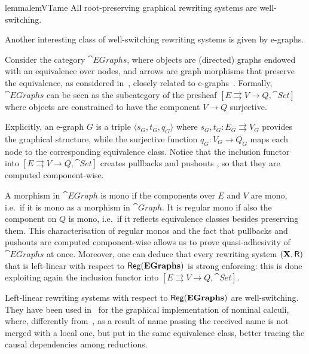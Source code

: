 \begin{lemma}{lemma}{lemVTame}
	\label{bono}
	All root-preserving graphical rewriting systems are well-switching.
\end{lemma}

Another interesting class of well-switching rewriting systems is given by e-graphs.

\begin{example}[E-graphs]
	Consider the category $\cat{EGraphs}$, where objects are (directed)
	graphs endowed with an equivalence over nodes, and arrows are graph
	morphisms that preserve the equivalence, as considered
	in~\cite{BaldanGM06}, closely related to e-graphs~\cite{WNW:egg}. 
	Formally, $\cat{EGraphs}$ can be seen as the
	subcategory of the presheaf
	$[E \rightrightarrows V \to Q, \cat{Set}]$ where objects are
	constrained to have the component $V \to Q$ surjective. 
	
	Explicitly, an
	e-graph $G$ is a triple $\langle s_G, t_G, q_G \rangle$ where
	$s_G, t_G: E_G \rightrightarrows V_G$ provides the graphical
	structure, while the surjective function $q_G : V_G \to Q_G$ maps
	each node to the corresponding equivalence class. 
	Notice that the inclusion functor into  $[E \rightrightarrows V \to Q, \cat{Set}]$ 
	creates pullbacks and pushouts \cite{mac2013categories}, so that they are computed component-wise.
	
	A morphism in $\cat{EGraph}$ is mono if the components over $E$
	and $V$ are mono, i.e.~if it is mono as a morphism in
	$\cat{Graph}$. It is regular mono if also the component on
	$Q$ is mono, i.e.~if it reflects equivalence classes besides
	preserving them. This characterisation of regular monos and the fact that pullbacks and pushouts are computed component-wise allows us to prove quasi-adhesivity of $\cat{EGraphs}$ at once. Moreover, one can deduce that every rewriting system $(\textbf {\textup{X}}, \mathsf{R})$ that is left-linear with respect to $\mathsf{Reg}(\mathbf{EGraphs})$ is strong enforcing: this is done exploiting again the inclusion functor into $[E \rightrightarrows V \to Q, \cat{Set}]$.
	
	Left-linear rewriting systems with respect to $\mathsf{Reg}(\mathbf{EGraphs})$ are well-switching. They have been used in~\cite{BaldanGM06} for the graphical implementation of nominal calculi, where,
	differently from~\cite{Gad07}, as a result of name passing the received name is not merged with a local one, but put in the same equivalence class, better tracing the causal dependencies among reductions.
\end{example}




